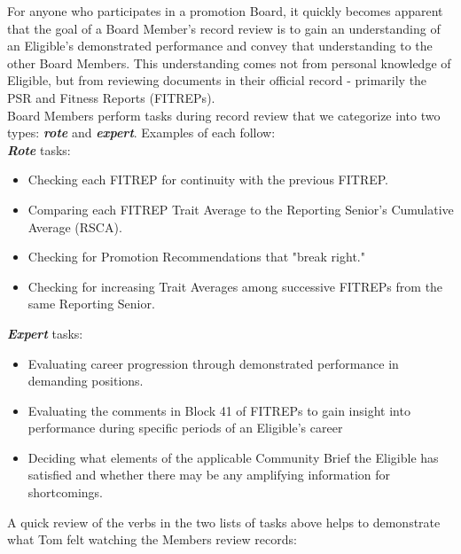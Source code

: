 \documentclass[UTF8]{article}
\begin{document}
For anyone who participates in a promotion Board, it quickly becomes apparent
that the goal of a Board Member's record review is to gain an understanding of
an Eligible's demonstrated performance and convey that understanding to the
other Board Members. This understanding comes not from personal knowledge of
Eligible, but from reviewing documents in their official record - primarily the
PSR and Fitness Reports (FITREPs).\\


Board Members perform tasks during record review that we categorize into two
types:
\textit{\textbf{rote}} and \textit{\textbf{expert}}. Examples of each follow:\\

\textit{\textbf{Rote}} tasks: 
\begin{itemize}
  \item Checking each FITREP for continuity with the previous FITREP.
  \item Comparing each FITREP Trait Average to the Reporting Senior's Cumulative
  Average (RSCA).
  \item Checking for Promotion Recommendations that "break right."
  \item Checking for increasing Trait Averages among successive FITREPs from the
  same Reporting Senior. 
\end{itemize}

\textit{\textbf{Expert}} tasks: 
\begin{itemize}
  \item Evaluating career progression through demonstrated performance in
  demanding positions.
  \item Evaluating the comments in Block 41 of FITREPs to gain insight into 
  performance during specific periods of an Eligible's career
  \item Deciding what elements of the applicable Community Brief the Eligible
  has satisfied and whether there may be any amplifying information for
  shortcomings.
\end{itemize}

A quick review of the verbs in the two lists of tasks above helps to demonstrate
what Tom felt watching the Members review records:\\
\end{document}
